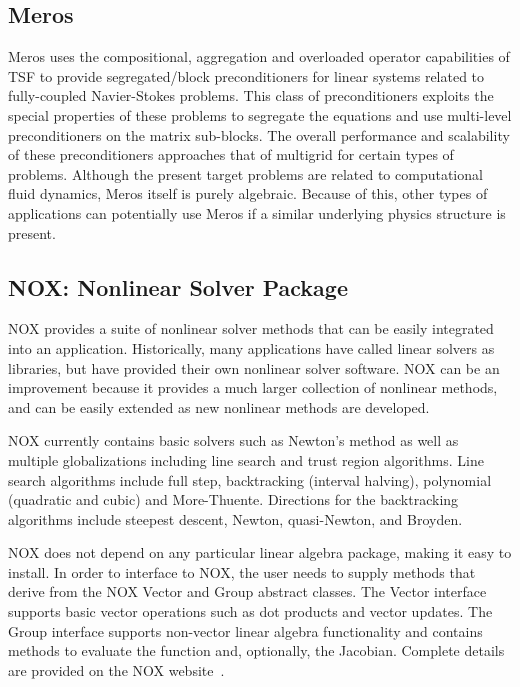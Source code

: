 \documentclass[12pt,relax]{TrilinosOverview}
\begin{document}
\subsection{Meros}

Meros uses the compositional, aggregation and overloaded operator capabilities of
TSF to provide segregated/block preconditioners for linear systems
related to fully-coupled Navier-Stokes problems.  This class of
preconditioners exploits the special properties of these problems to
segregate the equations and use multi-level preconditioners on the
matrix sub-blocks.  The overall performance and scalability of these
preconditioners approaches that of multigrid for certain types of
problems.  Although the present target problems are related to
computational fluid dynamics, Meros itself is purely algebraic.
Because of this, other types of applications can potentially use Meros
if a similar underlying physics structure is present.


\subsection{NOX: Nonlinear Solver Package}

NOX provides a suite of nonlinear solver methods that can be easily
integrated into an application.  Historically, many applications have
called linear solvers as libraries, but have provided their own
nonlinear solver software.  NOX can be an improvement because it
provides a much larger collection of nonlinear methods, and can be
easily extended as new nonlinear methods are developed.

NOX currently contains basic solvers such as Newton's method as well
as multiple globalizations including line search and trust
region algorithms. Line search algorithms include full step,
backtracking (interval halving), polynomial (quadratic and cubic) and
More-Thuente.  Directions for the backtracking algorithms include
steepest descent, Newton, quasi-Newton, and Broyden.

NOX does not depend on any particular linear algebra package, making
it easy to install. In order to interface to NOX, the user needs to
supply methods that derive from the NOX Vector and Group abstract
classes.  The Vector interface supports basic vector operations such
as dot products and vector updates. The Group interface supports
non-vector linear algebra functionality and contains methods to
evaluate the function and, optionally, the Jacobian.  Complete details
are provided on the NOX website~\cite{NOX-home-page}.
\end{document}
